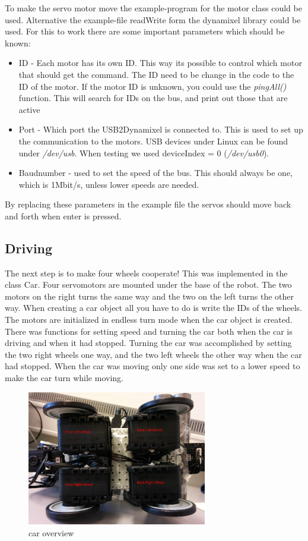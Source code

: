 To make the servo motor move the example-program for the motor class could be used. Alternative the example-file readWrite form the dynamixel library could be used. 
For this to work there are some important parameters which should be known:
\begin{itemize}
     \item ID - Each motor has its own ID. This way its possible to control which motor that should get the command. The ID need to be change in the code to the ID of the motor. If the motor ID is unknown, you could use the \textit{pingAll()} function. This will search for IDs on the bus, and print out those that are active
     \item Port - Which port the USB2Dynamixel is connected to. This is used to set up the communication to the motors. USB devices under Linux can be found under \textit{/dev/usb}. When testing we used deviceIndex = 0 (\textit{/dev/usb0}).
     \item Baudnumber - used to set the speed of the bus. This should always be one, which is 1Mbit/s, unless lower speeds are needed.
\end{itemize}
\bigskip

By replacing these parameters in the example file the servos should move back and forth when enter is pressed.


\subsection{Driving}
The next step is to make four wheels cooperate!
This was implemented in the class Car. Four servomotors are mounted under the base of the robot. The two motors on the right turns the same way and the two on the left turns the other way. When creating a car object all you have to do is write the IDs of the wheels. The motors are initialized in endless turn mode when the car object is created. There was functions for setting speed and turning the car both when the car is driving and when it had stopped. Turning the car was accomplished by setting the two right wheels one way, and the two left wheels the other way when the car had stopped. When the car was moving only one side was set to a lower speed to make the car turn while moving.


\begin{figure}[H]
    \centering
    \includegraphics[width=0.7\textwidth]{graphics/Car.png}
    \caption{car overview}
    \label{fig:car} 
\end{figure}


